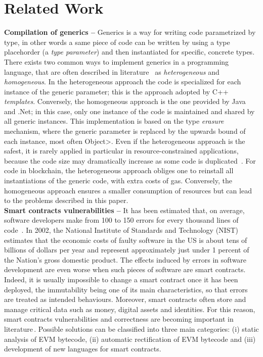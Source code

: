 \section{Related Work}\label{sec:related_work}



\textbf{Compilation of generics --}
Generics is a way for writing code parametrized by type, in other words a same piece of code can
be written by using a type placehorder (a \emph{type parameter}) and then instantiated for specific,
concrete types. There exists two common ways to implement generics in a programming language,
that are often described in literature~\cite{generics_categories} as \emph{heterogeneous}
and \emph{homogeneous}. In the heterogeneous approach the code is specialized for each instance
of the generic parameter; this is the approach adopted by C++ \emph{templates}.
Conversely, the homogeneous approach is the one provided by Java and .Net; in this case,
only one instance of the code is maintained and shared by all generic instances.
This implementation is based on the type \emph{erasure} mechanism, where the generic parameter
is replaced by the upwards bound of each instance, most often \<Object>.
Even if the heterogeneous approach is the safest, it is rarely applied in particular
in resource-constrained applications, because the code size may dramatically increase
as some code is duplicated~\cite{generics_embedded_systems}. For code in blockchain,
the heterogeneous approach obliges one to reinstall all instantiations of the generic code,
with extra costs of gas.
Conversely, the homogeneous approach ensures a smaller consumption
of resources but can lead to the problems described in this paper. \\

\textbf{Smart contracts vulnerabilities --}
It has been estimated that, on average, software developers make from 100 to 150 errors
for every thousand lines of code~\cite{software_engineering}.
In 2002, the National Institute of Standards and Technology (NIST) estimates that the economic
costs of faulty software in the US is about tens of billions of dollars per year and represent
approximately just under 1 percent of the Nation's gross domestic product.
The effects induced by errors in software development are even worse when such pieces of software
are smart contracts. Indeed, it is usually impossible to change a smart contract once
it has been deployed, the immutability being one of its main characteristics, so that
errors are treated as intended behaviours. Moreover, smart contracts often store and
manage critical data such as money, digital assets and identities. For this reason, smart contracts
vulnerabilities and correctness are becoming important in literature\,\cite{smart_contracts_verification}. Possible solutions can be
classified into three main categories: (i) static analysis of EVM bytecode,
(ii) automatic rectification of EVM bytecode and (iii) development of new languages
for smart contracts.


